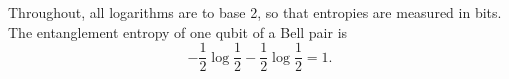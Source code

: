 \documentclass{article}
\begin{document}
Throughout, all logarithms are to base 2, so that entropies are measured in bits.
The entanglement entropy of one qubit of a Bell pair is
\begin{equation}
-\frac{1}{2}\log\frac{1}{2} - \frac{1}{2}\log\frac{1}{2} = 1 .
\label{eq:bit}
\end{equation}
\end{document}

